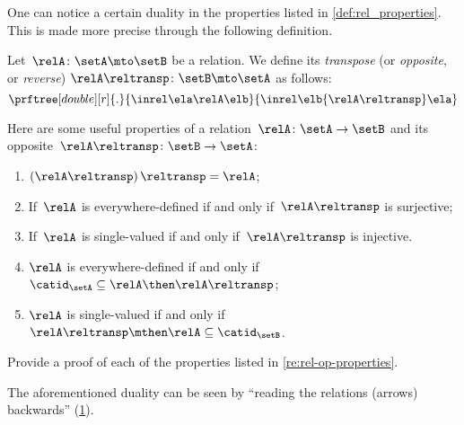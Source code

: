 One can notice a certain duality in the properties listed in \cref{def:rel_properties}.
This is made more precise through the following definition.


\begin{ctdefinition}
    \label{def:relation-transpose}
    Let~$\relA\colon \setA\mto \setB$ be a relation.
    We define its \emph{transpose} (or \emph{opposite}, or \emph{reverse}) $\relA\reltransp\colon \setB \mto \setA$ as follows:
    \begin{equation*}
        \prftree[double][r]{.}{
            \inrel \ela \relA \elb
        }{
            \inrel \elb {\relA\reltransp} \ela
        }
    \end{equation*}
\end{ctdefinition}
\begin{remark}
    \label{re:rel-op-properties}
    Here are some useful properties of a relation~$\relA\colon \setA\to \setB$  and its opposite~$\relA\reltransp\colon \setB\to \setA$:
    \begin{enumerate}
        \item $\left(\relA\reltransp\right)\reltransp = \relA $;
        \item If~$\relA$ is everywhere-defined if and only if~$\relA\reltransp$ is surjective;
        \item If~$\relA$ is single-valued if and only if~$\relA\reltransp$ is injective.
        \item $\relA$ is everywhere-defined if and only if~$\catid_\setA\subseteq \relA \then \relA\reltransp$;
        \item $\relA$ is single-valued if and only if~$\relA\reltransp\mthen \relA\subseteq \catid_\setB$.
    \end{enumerate}
\end{remark}

\begin{gradedexercise}
    \label{ex:RelProperties}
    Provide a proof of each of the properties listed in \cref{re:rel-op-properties}.
\end{gradedexercise}

\begin{remark}
    The aforementioned duality can be seen by ``reading the relations (arrows) backwards'' (\cref{fig:rel_transpose}).
\end{remark}

\begin{figure}[h!]
    \centering
    \caption{}
    \label{fig:rel_transpose}
\end{figure}

